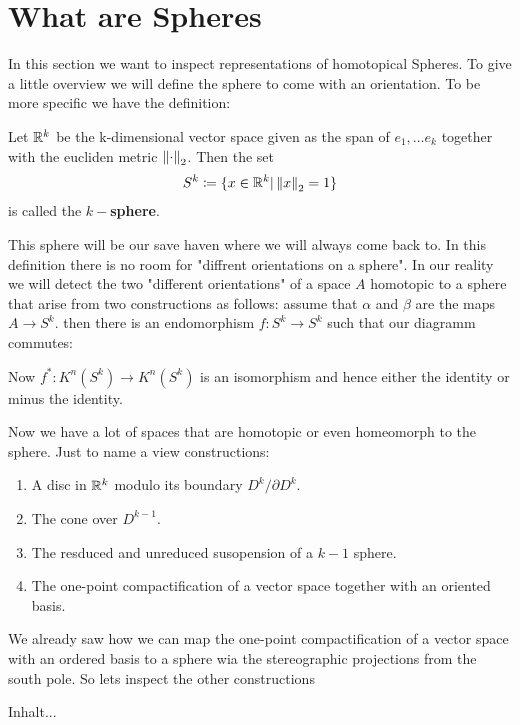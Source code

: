 \section{What are Spheres}
In this section we want to inspect representations of homotopical Spheres. To give a little overview we will define the sphere to come with an orientation. To be more specific we have the definition:
\begin{definition}
	Let $\mathbb{R}^k$ be the k-dimensional vector space given as the span of $e_1,\dots e_k$ together with the eucliden metric $\left\lVert\cdot\right\rVert_2$. Then the set
	\begin{align*}
		S^k\coloneq \{x\in \mathbb{R}^k|\left\lVert x\right\rVert_2=1 \}
	\end{align*} is called the \textbf{$k-$sphere}.
\end{definition} This sphere will be our save haven where we will always come back to. In this definition there is no room for "diffrent orientations on a sphere". In our reality we will detect the two  "different orientations" of a space $A$ homotopic to a sphere that arise from two constructions as follows: assume that $\alpha$ and $\beta$ are the maps $A\to S^k$. then there is an endomorphism $f: S^k\to S^k$ such that our diagramm commutes:
\begin{center}
\end{center}
 Now $f^*:K^n(S^k)\to K^n(S^k)$ is an isomorphism and hence either the identity or minus the identity.
 
 
Now we have a lot of spaces that are homotopic or even homeomorph to the sphere. Just to name a view constructions:
\begin{enumerate}
	\item A disc in $\mathbb{R}^k$ modulo its boundary $D^k\slash \partial D^k$.
	\item The cone over $D^{k-1}$.
	\item The resduced and unreduced susopension of a $k-1$ sphere. 
	\item The one-point compactification of a vector space together with an oriented basis.
\end{enumerate}
We already saw how we can map the one-point compactification of a vector space with an ordered basis to a sphere wia the stereographic projections from the south pole. 
So lets inspect the other constructions
\begin{cor}
	Inhalt...
\end{cor}
